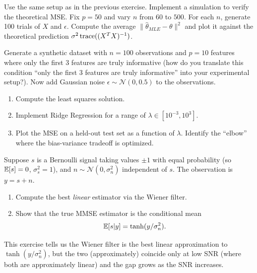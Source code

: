\begin{myexercise}
Use the same setup as in the previous exercise. Implement a simulation to verify the theoretical MSE.
Fix $p = 50$ and vary $n$ from $60$ to $500$.
For each $n$, generate 100 trials of $X$ and $\epsilon$.
Compute the average $\| \hat{\theta}_{MLE} - \theta \|^2$ and plot it against the theoretical prediction $\sigma^2 \operatorname{trace}((X^T X)^{-1})$.
   
\end{myexercise}

\begin{myexercise}
Generate a synthetic dataset with $n=100$ observations and $p=10$ features where only the first 3 features are truly informative (how do you translate this condition 
``only the first 3 features are truly informative'' into your experimental setup?). Now add Gaussian noise $\epsilon \sim \mathcal{N}(0, 0.5)$ to the observations.
\begin{enumerate}
\item  Compute the least squares solution.
\item Implement Ridge Regression for a range of $\lambda \in [10^{-3}, 10^3]$.
\item Plot the MSE on a held-out test set as a function of $\lambda$. Identify the ``elbow'' where the bias-variance tradeoff is optimized.
\end{enumerate}  
\end{myexercise}

\begin{myexercise}
Suppose $s$ is a Bernoulli signal taking values $\pm 1$ with equal probability (so $\mathbb{E}[s] = 0$, $\sigma_s^2 = 1$), and $n \sim \mathcal{N}(0, \sigma_n^2)$ independent of $s$. The observation is $y = s + n$. 
\begin{enumerate}
\item Compute the best {\em linear} estimator via
the Wiener filter. 
\item Show that the true MMSE estimator is the conditional mean
$$\mathbb{E}[s | y] = \tanh (y/\sigma_n^2).$$
\end{enumerate}
This exercise tells us the Wiener filter is the best linear approximation to $\tanh (y/\sigma_n^2)$, but the two (approximately) coincide only at low SNR (where both are approximately linear) and the gap grows as the SNR increases.

\end{myexercise}   



